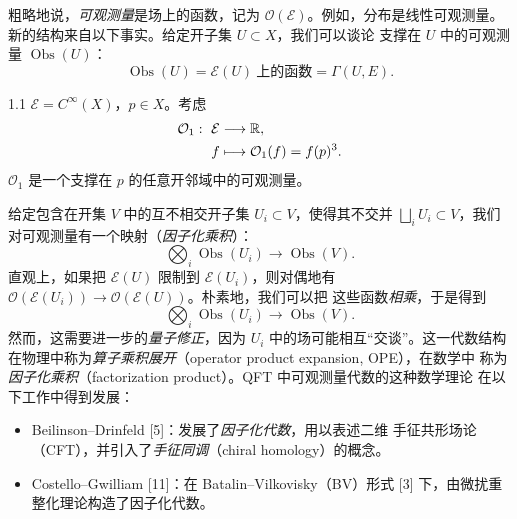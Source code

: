 
粗略地说，\emph{可观测量}是场上的函数，记为 $\mathcal{O}(\mathcal{E})$。例如，分布是线性可观测量。新的结构来自以下事实。给定开子集 $U\subset X$，我们可以谈论
支撑在 $U$ 中的可观测量 $\operatorname{Obs}(U)$：
\[
  \operatorname{Obs}(U)=\mathcal{E}(U)\ \text{上的函数}=\Gamma(U,E).
\]


\begin{wexam}{1.1}
  $\mathcal{E}=C^{\infty}(X)$，$p\in X$。考虑
  \[
    \begin{aligned}
      \mathcal{O}_1:\ \mathcal{E}&\longrightarrow \mathbb{R},\\
      f&\longmapsto \mathcal{O}_1(f)=f(p)^3.
    \end{aligned}
  \]
  $\mathcal{O}_1$ 是一个支撑在 $p$ 的任意开邻域中的可观测量。
\end{wexam}

给定包含在开集 $V$ 中的互不相交开子集 $U_i\subset V$，使得其不交并
$\bigsqcup_i U_i\subset V$，我们对可观测量有一个映射（\emph{因子化乘积}）：
\[
  \bigotimes_i \operatorname{Obs}(U_i)\longrightarrow \operatorname{Obs}(V).
\]
直观上，如果把 $\mathcal{E}(U)$ 限制到 $\mathcal{E}(U_i)$，则对偶地有
$\mathcal{O}(\mathcal{E}(U_i))\to\mathcal{O}(\mathcal{E}(U))$。朴素地，我们可以把
这些函数\emph{相乘}，于是得到
\[
  \bigotimes_i \operatorname{Obs}(U_i)\longrightarrow \operatorname{Obs}(V).
\]
然而，这需要进一步的\emph{量子修正}，因为 $U_i$ 中的场可能相互“交谈”。这一代数结构在物理中称为\emph{算子乘积展开}（operator product expansion, OPE），在数学中
称为\emph{因子化乘积}（factorization product）。QFT 中可观测量代数的这种数学理论
在以下工作中得到发展：

\begin{itemize}[leftmargin=1.6em,itemsep=0.2em]
  \item Beilinson--Drinfeld \textup{[5]}：发展了\emph{因子化代数}，用以表述二维
        手征共形场论（CFT），并引入了\emph{手征同调}（chiral homology）的概念。
  \item Costello--Gwilliam \textup{[11]}：在 Batalin--Vilkovisky（BV）形式
        \textup{[3]} 下，由微扰重整化理论构造了因子化代数。
\end{itemize}

